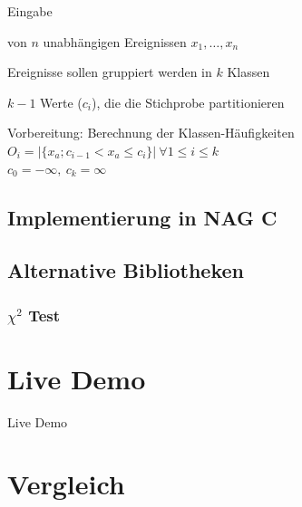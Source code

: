 \documentclass{beamer}
\begin{document}
\begin{frame}{\insertsubsection}
\begin{block}{Eingabe}
	\begin{description}[]
	\item[Zufallsstichprobe] von $n$ unabhängigen Ereignissen $x_1, \ldots, x_n$
	\item[Klassenanzahl] Ereignisse sollen gruppiert werden in $k$ Klassen
	\item[Klassengrenzen] $k-1$ Werte ($c_i$), die die Stichprobe partitionieren
	\end{description}
\end{block}
\begin{block}{Vorbereitung: Berechnung der Klassen-Häufigkeiten}
	$O_i = \left|\{ x_a ; c_{i-1} < x_a \leq c_i \}\right| ~ \forall 1 \leq i \leq k$
	\\
	$c_0 = -\infty, ~ c_k = \infty$
\end{block}
\end{frame}
\subsection{Implementierung in NAG C}
\subsection{Alternative Bibliotheken}
\begin{frame}
\frametitle{$\chi^2$ Test}
\end{frame}

\section{Live Demo}

\begin{frame}{\insertsection}
\center
\Huge Live Demo
\end{frame}

\section{Vergleich}
\end{document}
